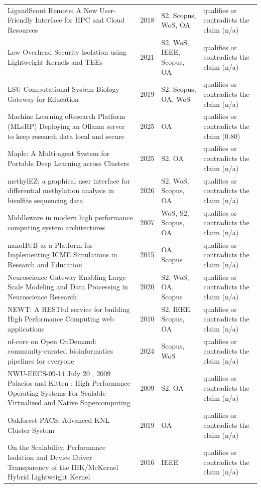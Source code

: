 \begin{longtable}{@{}%
  >{\raggedright\arraybackslash}p{}c%
  >{\raggedright\arraybackslash}p{}%
  >{\raggedright\arraybackslash}p{}@{}}
LigandScout Remote: A New User-Friendly Interface for HPC and Cloud Resources & 2018 & S2, Scopus, WoS, OA & qualifies or contradicts the claim (n/a) \\
Low Overhead Security Isolation using Lightweight Kernels and TEEs & 2021 & S2, WoS, IEEE, Scopus, OA & qualifies or contradicts the claim (n/a) \\
LSU Computational System Biology Gateway for Education & 2019 & S2, Scopus, OA, WoS & qualifies or contradicts the claim (n/a) \\
Machine Learning eResearch Platform (MLeRP) Deploying an Ollama server to keep research data local and secure & 2025 & OA & qualifies or contradicts the claim (0.80) \\
Maple: A Multi-agent System for Portable Deep Learning across Clusters & 2025 & S2, OA & qualifies or contradicts the claim (n/a) \\
methylEZ: a graphical user interface for differential methylation analysis in bisulfite sequencing data & 2026 & S2, WoS, Scopus, OA & qualifies or contradicts the claim (n/a) \\
Middleware in modern high performance computing system architectures & 2007 & WoS, S2, Scopus, OA & qualifies or contradicts the claim (n/a) \\
nanoHUB as a Platform for Implementing ICME Simulations in Research and Education & 2015 & OA, Scopus & qualifies or contradicts the claim (n/a) \\
Neuroscience Gateway Enabling Large Scale Modeling and Data Processing in Neuroscience Research & 2020 & S2, WoS, OA, Scopus & qualifies or contradicts the claim (n/a) \\
NEWT: A RESTful service for building High Performance Computing web applications & 2010 & S2, IEEE, Scopus, OA & qualifies or contradicts the claim (n/a) \\
nf-core on Open OnDemand: community-curated bioinformatics pipelines for everyone & 2024 & Scopus, WoS & qualifies or contradicts the claim (n/a) \\
NWU-EECS-09-14 July 20 , 2009 Palacios and Kitten : High Performance Operating Systems For Scalable Virtualized and Native Supercomputing & 2009 & S2, OA & qualifies or contradicts the claim (n/a) \\
Oakforest-PACS: Advanced KNL Cluster System & 2019 & OA & qualifies or contradicts the claim (n/a) \\
On the Scalability, Performance Isolation and Device Driver Transparency of the IHK/McKernel Hybrid Lightweight Kernel & 2016 & IEEE & qualifies or contradicts the claim (n/a) \\

\end{longtable}
